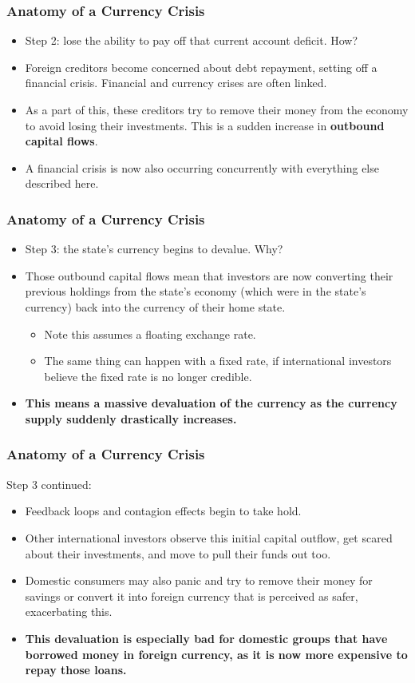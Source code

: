 \documentclass[handout]{beamer}
\begin{document}
\begin{frame} 
	\frametitle{\LARGE{Anatomy of a Currency Crisis}}
	\begin{itemize}
		\item Step 2: lose the ability to pay off that current account deficit. How? \pause
		\item Foreign creditors become concerned about debt repayment, setting off a financial crisis. Financial and currency crises are often linked. \pause
		\item As a part of this, these creditors try to remove their money from the economy to avoid losing their investments. This is a sudden increase in \textbf{outbound capital flows}. \pause
		\item A financial crisis is now also occurring concurrently with everything else described here.	
	\end{itemize}
\end{frame}

\begin{frame} 
	\frametitle{\LARGE{Anatomy of a Currency Crisis}}
	\begin{itemize}
		\item Step 3: the state's currency begins to devalue. Why?
		\item Those outbound capital flows mean that investors are now converting their previous holdings from the state's economy (which were in the state's currency) back into the currency of their home state.
		\begin{itemize}
			\item Note this assumes a floating exchange rate.
			\item The same thing can happen with a fixed rate, if international investors believe the fixed rate is no longer credible. \pause
		\end{itemize}
		\item \textbf{This means a massive devaluation of the currency as the currency supply suddenly drastically increases.}
	\end{itemize}
\end{frame}

\begin{frame} 
	\frametitle{\LARGE{Anatomy of a Currency Crisis}}
	Step 3 continued:
	\begin{itemize}
		\item Feedback loops and contagion effects begin to take hold.
		\item Other international investors observe this initial capital outflow, get scared about their investments, and move to pull their funds out too. \pause
		\item Domestic consumers may also panic and try to remove their money for savings or convert it into foreign currency that is perceived as safer, exacerbating this.
		\item \textbf{This devaluation is especially bad for domestic groups that have borrowed money in foreign currency, as it is now more expensive to repay those loans.}
	\end{itemize}
\end{frame}
\end{document}
